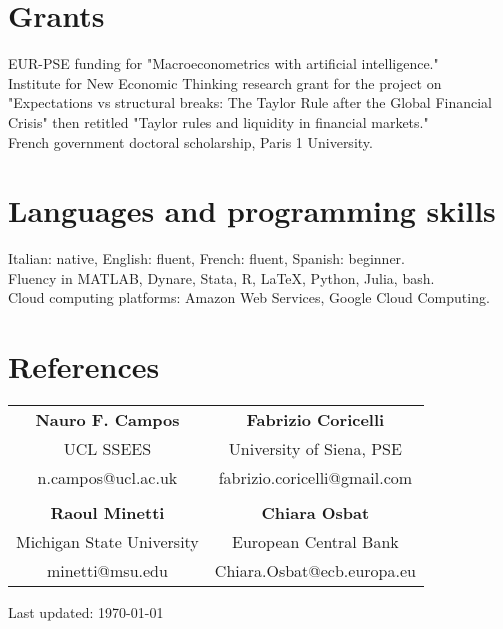 \documentclass[12pt, a4paper]{article} %
\newcommand{\years}[1]{\marginnote{\scriptsize #1}} %
\begin{document}


\section*{Grants}
\years{2020/21} EUR-PSE funding for "Macroeconometrics with artificial intelligence."\\
\years{2016/17} Institute for New Economic Thinking research grant for the project on "Expectations vs structural breaks: The Taylor Rule after the Global Financial Crisis" then retitled "Taylor rules and liquidity in financial markets."\\
\years{2015/18} French government doctoral scholarship, Paris 1 University.


\section*{Languages and programming skills}

Italian: native, English: fluent, French: fluent, Spanish: beginner.\\
Fluency in MATLAB, Dynare, Stata, R, \LaTeX, Python, Julia, bash.\\
Cloud computing platforms: Amazon Web Services, Google Cloud Computing.

\section*{References}
\begin{center}
	\begin{tabular}{cc}
		\textbf{Nauro F. Campos} 	& \textbf{Fabrizio Coricelli} 					\\
		UCL SSEES 				&University of Siena, PSE 		\\
		n.campos@ucl.ac.uk&fabrizio.coricelli@gmail.com \\
		&\\
		\textbf{Raoul Minetti} 						& \textbf{Chiara Osbat}\\
		Michigan State University & European Central Bank\\
		minetti@msu.edu 					& Chiara.Osbat@ecb.europa.eu\\
	\end{tabular}
\end{center}

\vfill{} %


\begin{center}
{\scriptsize Last updated: \today} %
\end{center}

\end{document}
